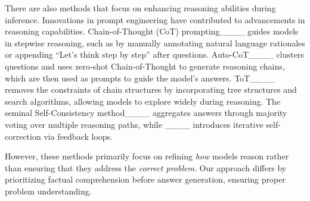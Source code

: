 There are also methods that focus on enhancing reasoning abilities during inference. Innovations in prompt engineering have contributed to advancements in reasoning capabilities. 
Chain-of-Thought (CoT) prompting____ guides models in stepwise reasoning, such as by manually annotating natural language rationales or appending “Let’s think step by step” after questions.
Auto-CoT____ clusters questions and uses zero-shot Chain-of-Thought to generate reasoning chains, which are then used as prompts to guide the model’s answers.
ToT____ removes the constraints of chain structures by incorporating tree structures and search algorithms, allowing models to explore widely during reasoning. 
The seminal Self-Consistency method____ aggregates answers through majority voting over multiple reasoning paths, while ____ introduces iterative self-correction via feedback loops. 


However, these methods primarily focus on refining \textit{how} models reason rather than ensuring that they address the \textit{correct problem}. Our approach differs by prioritizing factual comprehension before answer generation, ensuring proper problem understanding.